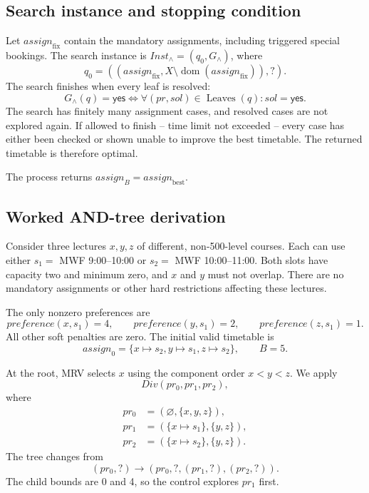 \subsection{Search instance and stopping condition}
\label{sec:and-instance}

Let $\mathit{assign}_{\mathrm{fix}}$ contain the
mandatory assignments, including triggered special
bookings. The search instance is
$\mathit{Inst}_{\land}=(q_0,G_{\land})$, where
\[
q_0=
((\mathit{assign}_{\mathrm{fix}},
  X\setminus\operatorname{dom}(
    \mathit{assign}_{\mathrm{fix}})),?).
\]
The search finishes when every leaf is resolved:
\[
G_{\land}(q)=\mathsf{yes}
\iff
\forall (pr,\mathit{sol})\in\operatorname{Leaves}(q):
\mathit{sol}=\mathsf{yes}.
\]
The search has finitely many assignment cases, and resolved
cases are not explored again. If allowed to finish -- time limit not exceeded -- every
case has either been checked or shown unable to improve
the best timetable. The returned timetable is therefore
optimal.

The process returns
$\mathit{assign}_B=\mathit{assign}_{\mathrm{best}}$.

\subsection{Worked AND-tree derivation}
\label{andopt:demonstration}

Consider three lectures $x,y,z$ of different,
non-500-level courses. Each can use either
$s_1=$ MWF 9:00--10:00 or
$s_2=$ MWF 10:00--11:00.
Both slots have capacity two and minimum zero,
and $x$ and $y$ must not overlap.
There are no mandatory assignments or other hard
restrictions affecting these lectures.

The only nonzero preferences are
\[
\mathit{preference}(x,s_1)=4,\qquad
\mathit{preference}(y,s_1)=2,\qquad
\mathit{preference}(z,s_1)=1.
\]
All other soft penalties are zero.
The initial valid timetable is
\[
\mathit{assign}_0
=\{x\mapsto s_2,y\mapsto s_1,z\mapsto s_2\},
\qquad B=5.
\]

At the root, MRV selects $x$ using the component
order $x<y<z$. We apply
\[
\mathit{Div}(pr_0,pr_1,pr_2),
\]
where
\[
\begin{aligned}
pr_0&=(\varnothing,\{x,y,z\}),\\
pr_1&=(\{x\mapsto s_1\},\{y,z\}),\\
pr_2&=(\{x\mapsto s_2\},\{y,z\}).
\end{aligned}
\]
The tree changes from
\[
(pr_0,?)
\longrightarrow
(pr_0,?,(pr_1,?),(pr_2,?)).
\]
The child bounds are 0 and 4, so the control explores
$pr_1$ first.

